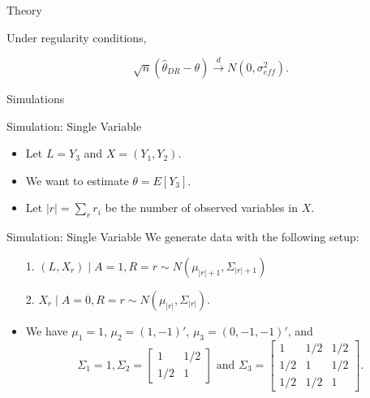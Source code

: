 \documentclass{beamer} %
\begin{document}
\begin{frame}{Theory}
  \begin{theorem}
    Under regularity conditions,

    \[\sqrt n (\hat \theta_{DR} - \theta) \stackrel{d}{\to} N(0, \sigma_{eff}^2).\]
  \end{theorem}
\end{frame}

\begin{frame}

  \begin{center}
    \Large
    Simulations
  \end{center}

\end{frame}

\begin{frame}{Simulation: Single Variable}
  \begin{itemize}
    \item Let $L = Y_3$ and $X = (Y_1, Y_2)$.
    \item We want to estimate $\theta = E[Y_3]$.
    \item Let $|r| = \sum_r r_i$ be the number of observed variables in $X$.
  \end{itemize}
\end{frame}

\begin{frame}{Simulation: Single Variable}
  We generate data with the following setup:
  \begin{itemize}
    \item[1.] $(L, X_r) \mid A = 1, R = r \sim N\left(\mu_{|r|+1}, \Sigma_{|r|+1}\right)$
    \item[2.] $X_r \mid A = 0, R = r \sim N\left(\mu_{|r|}, \Sigma_{|r|}\right)$.
      \vspace{0.3cm}
    \item We have $\mu_1 = 1$, $\mu_2 = (1, -1)'$, $\mu_3 = (0, -1, -1)'$, and 
      \[\Sigma_1 = 1, \Sigma_2 = \begin{bmatrix} 1 & 1/2 \\ 1/2 & 1 \end{bmatrix}
      \text{ and } \Sigma_3 = 
      \begin{bmatrix} 1 & 1/2 & 1/2 \\ 1/2 & 1 & 1/2 \\ 1/2 & 1/2 & 1 \end{bmatrix}.\]
  \end{itemize}
\end{frame}
\end{document}
